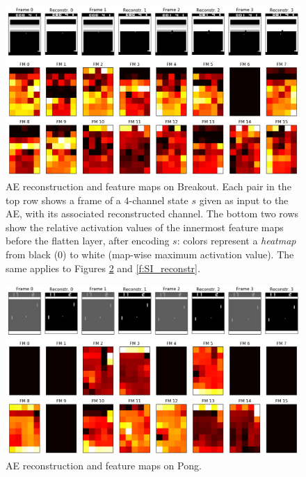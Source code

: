 %
%
\begin{figure}
    \includegraphics[width=\textwidth]{pictures/experiments/reconstr_breakout}
    \centering
    \caption[AE reconstruction and feature maps on Breakout]{AE reconstruction 
	    and feature maps on Breakout. 
	    Each pair in the top row shows a frame of a $4$-channel state $s$ 
	    given as input to the AE, with its associated reconstructed channel. 
	    The bottom two rows show the relative activation values of the 
	    innermost feature maps before the flatten layer, after encoding $s$: 
	    colors represent a \textit{heatmap} from black ($0$) to white 
	    (map-wise maximum activation value). The same applies to Figures 
	    \ref{f:P_reconstr} and \ref{f:SI_reconstr}.}
    \label{f:BO_reconstr}
\end{figure}
%
%
\begin{figure}
    \includegraphics[width=\textwidth]{pictures/experiments/reconstr_pong}
    \centering
    \caption[AE reconstruction and feature maps on Pong]{AE reconstruction 
	    and feature maps on Pong.}
    \label{f:P_reconstr}
\end{figure}
